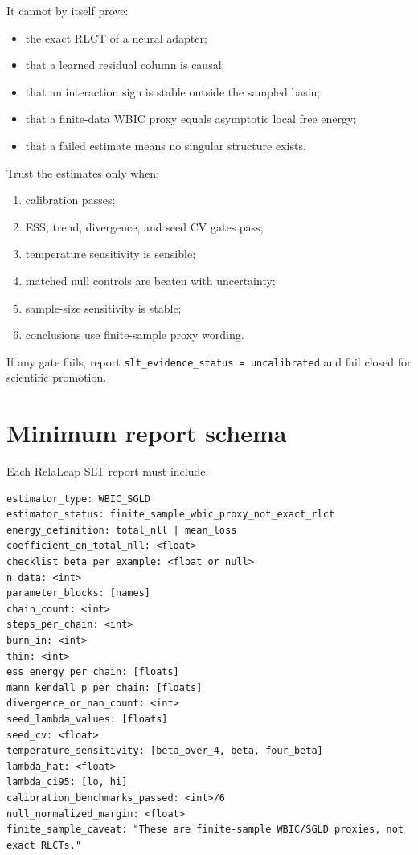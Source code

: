 \documentclass[11pt]{article}
\begin{document}
It cannot by itself prove:
\begin{itemize}
\item the exact RLCT of a neural adapter;
\item that a learned residual column is causal;
\item that an interaction sign is stable outside the sampled basin;
\item that a finite-data WBIC proxy equals asymptotic local free energy;
\item that a failed estimate means no singular structure exists.
\end{itemize}

Trust the estimates only when:
\begin{enumerate}[(1)]
\item calibration passes;
\item ESS, trend, divergence, and seed CV gates pass;
\item temperature sensitivity is sensible;
\item matched null controls are beaten with uncertainty;
\item sample-size sensitivity is stable;
\item conclusions use finite-sample proxy wording.
\end{enumerate}

If any gate fails, report \texttt{slt\_evidence\_status = uncalibrated} and fail closed for scientific promotion.

\section{Minimum report schema}

Each RelaLeap SLT report must include:
\begin{verbatim}
estimator_type: WBIC_SGLD
estimator_status: finite_sample_wbic_proxy_not_exact_rlct
energy_definition: total_nll | mean_loss
coefficient_on_total_nll: <float>
checklist_beta_per_example: <float or null>
n_data: <int>
parameter_blocks: [names]
chain_count: <int>
steps_per_chain: <int>
burn_in: <int>
thin: <int>
ess_energy_per_chain: [floats]
mann_kendall_p_per_chain: [floats]
divergence_or_nan_count: <int>
seed_lambda_values: [floats]
seed_cv: <float>
temperature_sensitivity: [beta_over_4, beta, four_beta]
lambda_hat: <float>
lambda_ci95: [lo, hi]
calibration_benchmarks_passed: <int>/6
null_normalized_margin: <float>
finite_sample_caveat: "These are finite-sample WBIC/SGLD proxies, not exact RLCTs."
\end{verbatim}
\end{document}
